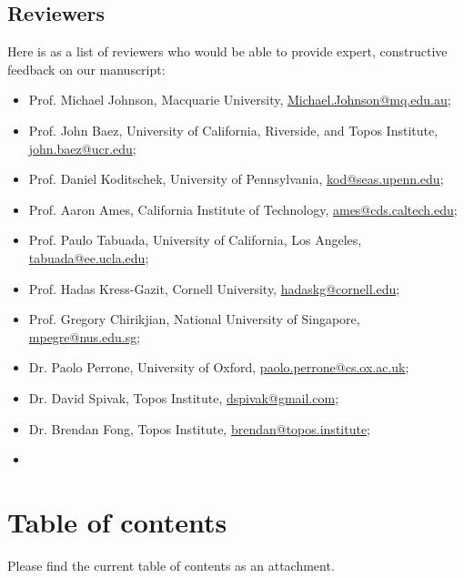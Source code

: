 \documentclass[10pt, article, one side]{memoir}
\begin{document}
    \section{Reviewers}
    Here is as a list of reviewers who would be able to provide expert, constructive feedback on our manuscript:
    \begin{itemize}
        \item Prof.
              Michael Johnson, Macquarie University, \href{mailto:Michael.Johnson@mq.edu.au}{Michael.Johnson@mq.edu.au};
        \item Prof.
              John Baez, University of California, Riverside, and Topos Institute, \href{mailto:john.baez@ucr.edu}{john.baez@ucr.edu};
        \item Prof.
              Daniel Koditschek, University of Pennsylvania, \href{mailto:kod@seas.upenn.edu}{kod@seas.upenn.edu};
        \item Prof.
              Aaron Ames, California Institute of Technology, \href{mailto:ames@cds.caltech.edu}{ames@cds.caltech.edu};
        \item Prof.
              Paulo Tabuada, University of California, Los Angeles, \href{mailto:tabuada@ee.ucla.edu}{tabuada@ee.ucla.edu};
        \item Prof.
              Hadas Kress-Gazit, Cornell University, \href{mailto:hadaskg@cornell.edu}{hadaskg@cornell.edu};
        \item Prof.
              Gregory Chirikjian, National University of Singapore, \href{mailto:mpegre@nus.edu.sg}{mpegre@nus.edu.sg};
        \item Dr.
              Paolo Perrone, University of Oxford, \href{mailto:paolo.perrone@cs.ox.ac.uk}{paolo.perrone@cs.ox.ac.uk};
        \item Dr.
              David Spivak, Topos Institute, \href{mailto:dspivak@gmail.com}{dspivak@gmail.com};
        \item Dr.
              Brendan Fong, Topos Institute, \href{mailto:brendan@topos.institute}{brendan@topos.institute};
        \item {}
    \end{itemize}

    \chapter{Table of contents}
    Please find the current table of contents as an attachment.
\end{document}
